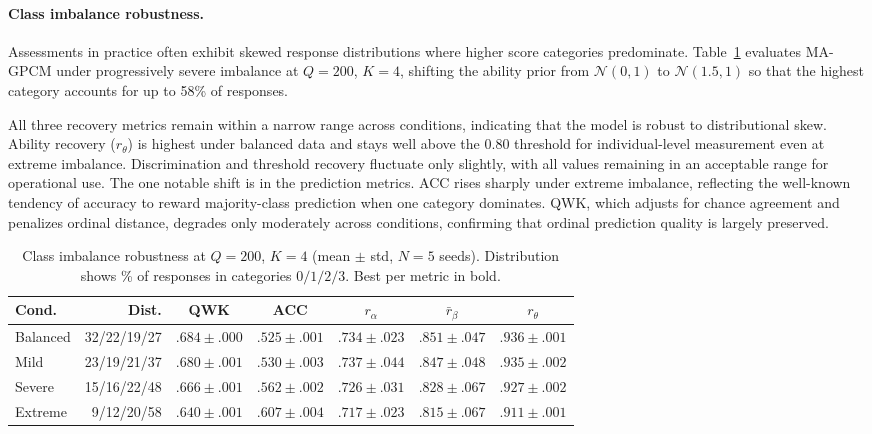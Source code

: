 \documentclass[pdflatex,sn-apa]{sn-jnl}
\begin{document}
\paragraph{Class imbalance robustness.}
\label{sec:imbalance_results}
Assessments in practice often exhibit skewed response distributions where higher score categories predominate. Table~\ref{tab:imbalance} evaluates MA-GPCM under progressively severe imbalance at $Q=200$, $K=4$, shifting the ability prior from $\mathcal{N}(0,1)$ to $\mathcal{N}(1.5,1)$ so that the highest category accounts for up to 58\% of responses.

All three recovery metrics remain within a narrow range across conditions, indicating that the model is robust to distributional skew. Ability recovery ($r_\theta$) is highest under balanced data and stays well above the $0.80$ threshold for individual-level measurement \citep{embretson_irt_2000} even at extreme imbalance. Discrimination and threshold recovery fluctuate only slightly, with all values remaining in an acceptable range for operational use. The one notable shift is in the prediction metrics. ACC rises sharply under extreme imbalance, reflecting the well-known tendency of accuracy to reward majority-class prediction when one category dominates. QWK, which adjusts for chance agreement and penalizes ordinal distance, degrades only moderately across conditions, confirming that ordinal prediction quality is largely preserved.

\begin{table}[htb!]
\centering
\caption{Class imbalance robustness at $Q=200$, $K=4$ (mean $\pm$ std, $N\!=\!5$ seeds). Distribution shows \% of responses in categories $0/1/2/3$. Best per metric in bold.}
\label{tab:imbalance}
\small
\setlength{\tabcolsep}{2pt}
\begin{tabular}{@{}lrccccc@{}}
\toprule
\textbf{Cond.} & \textbf{Dist.} & \textbf{QWK} & \textbf{ACC} & $r_\alpha$ & $\bar{r}_\beta$ & $r_\theta$ \\
\midrule
Balanced  & 32/22/19/27 & $\mathbf{.684} \pm .000$ & $.525 \pm .001$ & $.734 \pm .023$ & $\mathbf{.851} \pm .047$ & $\mathbf{.936} \pm .001$ \\
Mild      & 23/19/21/37 & $.680 \pm .001$ & $.530 \pm .003$ & $\mathbf{.737} \pm .044$ & $.847 \pm .048$ & $.935 \pm .002$ \\
Severe    & 15/16/22/48 & $.666 \pm .001$ & $.562 \pm .002$ & $.726 \pm .031$ & $.828 \pm .067$ & $.927 \pm .002$ \\
Extreme   & \phantom{0}9/12/20/58 & $.640 \pm .001$ & $\mathbf{.607} \pm .004$ & $.717 \pm .023$ & $.815 \pm .067$ & $.911 \pm .001$ \\
\bottomrule
\end{tabular}
\end{table}
\end{document}
